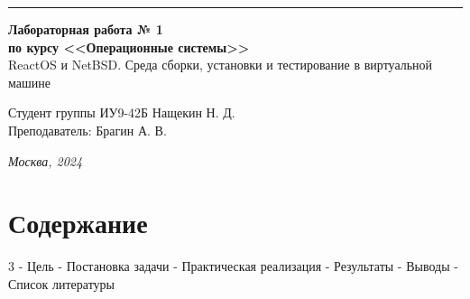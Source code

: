 \documentclass[a4paper, 14pt]{extarticle}
\begin{document}
\begin{titlepage}
\vspace*{-16pt}
\hspace{30pt}\rule{0.866\textwidth}{0.4pt}
  
\vspace{11em}

\begin{center}
\Large {\bf Лабораторная работа № 1} \\ 
\large {\bf по курсу <<Операционные системы>>} \\ 
{ReactOS и NetBSD. Среда сборки, установки и
тестирование в виртуальной машине} \\
\end{center}\normalsize

\vspace{8em}


\begin{flushright}
  {Студент группы ИУ9-42Б Нащекин Н. Д.\hspace*{15pt} \\
  \vspace{2ex}
  Преподаватель: Брагин А. В.\hspace*{15pt}}
\end{flushright}

\bigskip

\vfill
 

\begin{center}
\textsl{Москва, 2024}
\end{center}
\end{titlepage}

\renewcommand{\ttdefault}{pcr}

\setlength{\tabcolsep}{3pt}
\newpage
\setcounter{page}{2}

\section{Содержание}
\begin{flushleft}
3 - Цель  - Постановка задачи  - Практическая реализация  - Результаты  - Выводы  - Список литературы \newline
\end{flushleft}
\pagebreak
\end{document}
